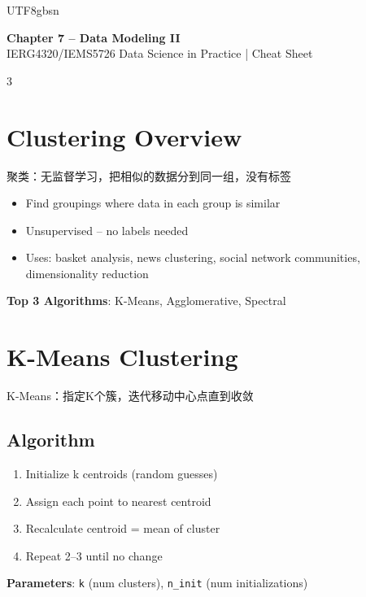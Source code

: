 \documentclass[9pt,landscape,a4paper]{article}
\newcommand{\zhint}[1]{{\scriptsize\color{gray!70!black}#1}}
\begin{document}
\begin{CJK}{UTF8}{gbsn}

\begin{center}
{\large\bfseries\color{blue!70!black} Chapter 7 -- Data Modeling II}\\
{\footnotesize IERG4320/IEMS5726 Data Science in Practice | Cheat Sheet}
\end{center}

\begin{multicols}{3}

\section{Clustering Overview}
\zhint{聚类：无监督学习，把相似的数据分到同一组，没有标签}

\begin{itemize}[leftmargin=8pt,itemsep=0pt,topsep=0pt]
\item Find groupings where data in each group is similar
\item Unsupervised -- no labels needed
\item Uses: basket analysis, news clustering, social network communities, dimensionality reduction
\end{itemize}

\textbf{Top 3 Algorithms}: K-Means, Agglomerative, Spectral

\section{K-Means Clustering}
\zhint{K-Means：指定K个簇，迭代移动中心点直到收敛}

\subsection{Algorithm}
\begin{enumerate}[leftmargin=10pt,itemsep=0pt,topsep=0pt]
\item Initialize k centroids (random guesses)
\item Assign each point to nearest centroid
\item Recalculate centroid = mean of cluster
\item Repeat 2--3 until no change
\end{enumerate}
\textbf{Parameters}: \texttt{k} (num clusters), \texttt{n\_init} (num initializations)


\end{multicols}
\end{CJK}
\end{document}
